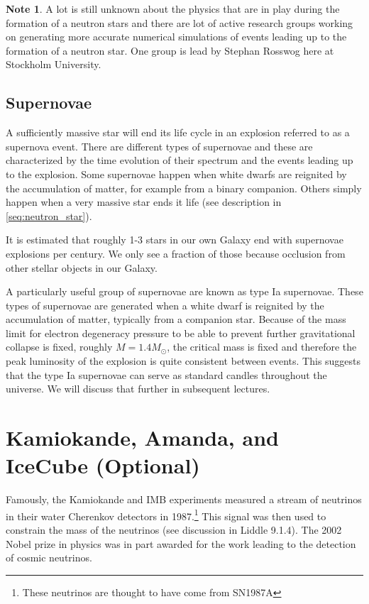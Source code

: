 \documentclass[a4paper,12pt]{article}
\theoremstyle{remark}
\renewcommand{\=}[1]{\stackrel{#1}{=}} %
\theoremstyle{plain}
\theoremstyle{definition}
\newtheorem*{definitionT}{Note}%
\newenvironment{note}{
\begin{dBox}
\begin{definitionT}}
{\end{definitionT}
\end{dBox}}
\begin{document}
\begin{note}
A lot is still unknown about the physics that are in play during the formation of a neutron stars and there are lot of active research groups working on generating more accurate numerical simulations of events leading up to the formation of a neutron star. One group is lead by Stephan Rosswog here at Stockholm University.
\end{note}

\subsection{Supernovae}

A sufficiently massive star will end its life cycle in an explosion referred to as a supernova event. There are different types of supernovae and these are characterized by the time evolution of their spectrum and the events leading up to the explosion. Some supernovae happen when white dwarfs are reignited by the accumulation of matter, for example from a binary companion. Others simply happen when a very massive star ends it life (see description in \ref{seq:neutron_star}). 

It is estimated that roughly 1-3 stars in our own Galaxy end with supernovae explosions per century. We only see a fraction of those because occlusion from other stellar objects in our Galaxy. 

A particularly useful group of supernovae are known as type Ia supernovae. These types of supernovae are generated when a white dwarf is reignited by the accumulation of matter, typically from a companion star. Because of the mass limit for electron degeneracy pressure to be able to prevent further gravitational collapse is fixed, roughly $M = 1.4 M_\odot$, the critical mass is fixed and therefore the peak luminosity of the explosion is quite consistent between events. This suggests that the type Ia supernovae can serve as standard candles throughout the universe. We will discuss that further in subsequent lectures.

\section{Kamiokande, Amanda, and IceCube (Optional)}
Famously, the Kamiokande and IMB experiments measured a stream of neutrinos in their water Cherenkov detectors in 1987.\footnote{These neutrinos are thought to have come from SN1987A} This signal was then used to constrain the mass of the neutrinos (see discussion in Liddle 9.1.4). The 2002 Nobel prize in physics was in part awarded for the work leading to the detection of cosmic neutrinos.
\end{document}
